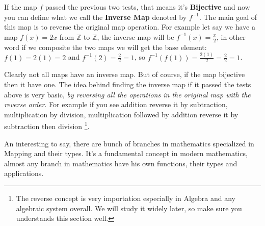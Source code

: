 If the map $f$ passed the previous two tests, that means it's {\bf Bijective} and now you can define what we call the {\bf Inverse Map} denoted by $f^{-1}$. The main goal of this map is to reverse the original map operation. For example let say we have a map $f(x)=2x$ from $\mathbb{Z}$ to $\mathbb{Z}$, the inverse map will be $f^{-1}(x)=\frac{x}{2}$, in other word if we composite the two maps we will get the base element: $f(1)=2(1)=2$ and $f^{-1}(2)=\frac{2}{2}=1$, so $f^{-1}(f(1))=\frac{2(1)}{2}=\frac{2}{2}=1$.

Clearly not all maps have an inverse map. But of course, if the map bijective then it have one. The idea behind finding the inverse map if it passed the tests above is very basic, {\it by reversing all the operations in the original map with the reverse order}. For example if you see addition reverse it by subtraction, multiplication by division, multiplication followed by addition reverse it by subtraction then division \footnote{The reverse concept is very importation especially in Algebra and any algebraic system overall. We will study it widely later, so make sure you understands this section well.}.

An interesting to say, there are bunch of branches in mathematics specialized in Mapping and their types. It's a fundamental concept in modern mathematics, almost any branch in mathematics have his own functions, their types and applications.
